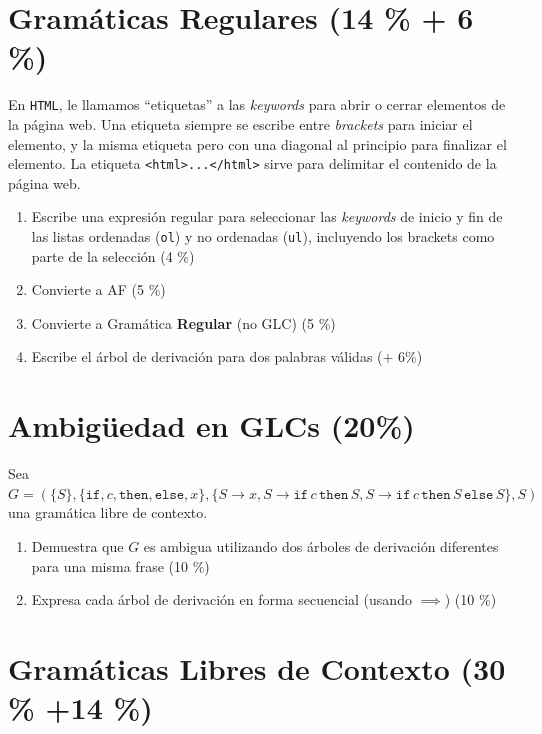 \documentclass{article}
\begin{document}
\section{Gramáticas Regulares (14 \% + 6 \%)}

En \texttt{HTML}, le llamamos ``etiquetas'' a las \textit{keywords} para abrir o cerrar elementos de la página web.
Una etiqueta siempre se escribe entre \textit{brackets} para iniciar el elemento, y la misma etiqueta pero con una diagonal al principio para finalizar el elemento.
La etiqueta \verb|<html>...</html>| sirve para delimitar el contenido de la página web.

\begin{enumerate}[label=\tt \alph*)]
    \itemsep0em
    \item Escribe una expresión regular para seleccionar las \textit{keywords} de inicio y fin de las listas ordenadas (\texttt{ol}) y no ordenadas (\texttt{ul}), incluyendo los brackets como parte de la selección (4 \%)
    \item Convierte a AF (5 \%)
    \item Convierte a Gramática \textbf{Regular} (no GLC) (5 \%)
    \item Escribe el árbol de derivación para dos palabras válidas (+ 6\%)
\end{enumerate}


\section{Ambigüedad en GLCs (20\%)}

Sea $G=(\{S\},\{\mathtt{if}, c, \mathtt{then}, \mathtt{else}, x\}, \{S \to x, S \to \mathtt{if} \, c \, \mathtt{then} \, S, S \to \mathtt{if} \, c \, \mathtt{then} \, S \, \mathtt{else} \, S\}, S)$ una gramática libre de contexto.

\begin{enumerate}[label=\tt \alph*)]
    \item Demuestra que $G$ es ambigua utilizando dos árboles de derivación diferentes para una misma frase (10 \%)
    \item Expresa cada árbol de derivación en forma secuencial (usando $\implies$) (10 \%)
\end{enumerate}


\section{Gramáticas Libres de Contexto (30 \% +14 \%)}
\end{document}
